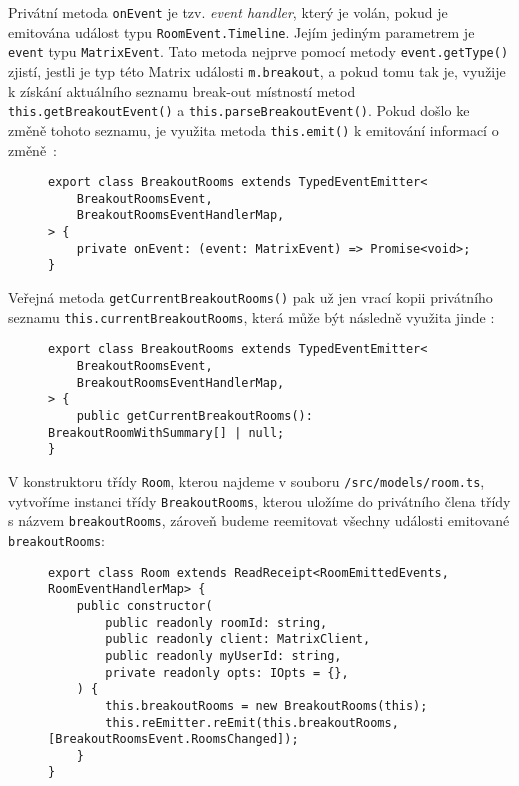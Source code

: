Privátní metoda \texttt{onEvent} je tzv. \textit{event handler},
který je volán, pokud je emitována událost typu
\texttt{RoomEvent.Timeline}. Jejím jediným parametrem je
\texttt{event} typu \texttt{MatrixEvent}. Tato
metoda nejprve pomocí metody \texttt{event.getType()} zjistí,
jestli je typ této Matrix události \texttt{m.breakout}, a pokud tomu
tak je, využije k získání aktuálního seznamu break-out místností metod
\texttt{this.getBreakoutEvent()} a
\texttt{this.parseBreakoutEvent()}. Pokud došlo ke změně tohoto
seznamu, je využita metoda \texttt{this.emit()} k emitování
informací o změně~\parencite{GitHub-MatrixJSSDK-BreakoutRooms}:

\begin{figure}[H]
    \begin{verbatim}
export class BreakoutRooms extends TypedEventEmitter<
	BreakoutRoomsEvent,
	BreakoutRoomsEventHandlerMap,
> {
	private onEvent: (event: MatrixEvent) => Promise<void>;
}
	\end{verbatim}
\end{figure}

Veřejná metoda \texttt{getCurrentBreakoutRooms()} pak už jen
vrací kopii privátního seznamu
\texttt{this.currentBreakoutRooms}, která může být následně
využita jinde \parencite{GitHub-MatrixJSSDK-BreakoutRooms}:

\begin{figure}[H]
    \begin{verbatim}
export class BreakoutRooms extends TypedEventEmitter<
	BreakoutRoomsEvent,
	BreakoutRoomsEventHandlerMap,
> {
	public getCurrentBreakoutRooms(): BreakoutRoomWithSummary[] | null;
}
	\end{verbatim}
\end{figure}

V konstruktoru třídy \texttt{Room}, kterou najdeme v souboru
\texttt{/src/models/room.ts}, vytvoříme instanci třídy
\texttt{BreakoutRooms}, kterou uložíme do privátního člena třídy
s názvem \texttt{breakoutRooms}, zároveň budeme reemitovat
všechny události emitované \texttt{breakoutRooms}:

\begin{figure}[H]
    \begin{verbatim}
export class Room extends ReadReceipt<RoomEmittedEvents, RoomEventHandlerMap> {
	public constructor(
		public readonly roomId: string,
		public readonly client: MatrixClient,
		public readonly myUserId: string,
		private readonly opts: IOpts = {},
	) {
		this.breakoutRooms = new BreakoutRooms(this);
		this.reEmitter.reEmit(this.breakoutRooms, [BreakoutRoomsEvent.RoomsChanged]);
	}
}
	\end{verbatim}
\end{figure}

